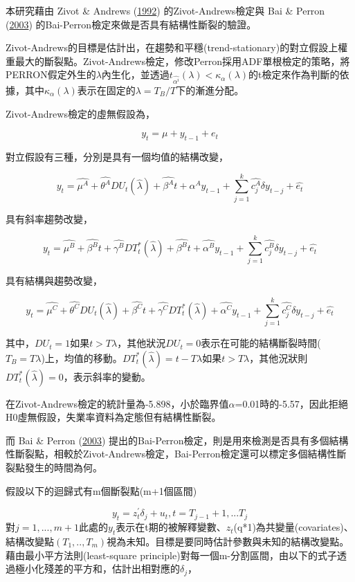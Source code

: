 \documentclass[oneside]{book}
\begin{document}
本研究藉由 Zivot \& Andrews (\protect\hyperlink{ref-zivotFurtherEvidenceGreat1992}{1992}) 的Zivot-Andrews檢定與 Bai \& Perron (\protect\hyperlink{ref-baiComputationAnalysisMultiple2003}{2003}) 的Bai-Perron檢定來做是否具有結構性斷裂的驗證。

Zivot-Andrews的目標是估計出，在趨勢和平穩(trend-stationary)的對立假設上權重最大的斷裂點。Zivot-Andrews檢定，修改Perron採用ADF單根檢定的策略，將PERRON假定外生的\(\lambda\)內生化，並透過\(t_{\hat{\alpha^i}}(\lambda)<\kappa_\alpha(\lambda)\)的t檢定來作為判斷的依據，其中\(\kappa_\alpha(\lambda)\)表示在固定的\(\lambda=T_B/T\)下的漸進分配。

Zivot-Andrews檢定的虛無假設為，

\[y_t = \mu+y_{t-1}+e_t\]

對立假設有三種，分別是具有一個均值的結構改變，

\[y_t=\hat{\mu^A}+\hat{\theta^A}DU_t(\hat{\lambda})+\hat{\beta^A}t+\hat{\alpha^A}y_{t-1}+\sum\limits^k_{j=1}\hat{c_j^A}\delta y_{t-j}+\hat{e_t}\]

具有斜率趨勢改變，

\[y_t=\hat{\mu^B}+\hat{\beta^B}t+\hat{\gamma^B}DT^*_t(\hat{\lambda})+\hat{\beta^B}t+\hat{\alpha^B}y_{t-1}+\sum\limits^k_{j=1}\hat{c_j^B}\delta y_{t-j}+\hat{e_t}\]

具有結構與趨勢改變，

\[y_t=\hat{\mu^C}+\hat{\theta^C}DU_t(\hat{\lambda})+\hat{\beta^C}t+\hat{\gamma^C}DT^*_t(\hat{\lambda})+\hat{\alpha^C}y_{t-1}+\sum\limits^k_{j=1}\hat{c_j^C}\delta y_{t-j}+\hat{e_t}\]

其中，\(DU_t=1\)如果\(t>T\lambda\)，其他狀況\(DU_t=0\)表示在可能的結構斷裂時間(\(T_B=T\lambda\))上，均值的移動。\(DT^*_t(\hat{\lambda})=t-T\lambda\)如果\(t>T\lambda\)，其他況狀則\(DT^*_t(\hat{\lambda})=0\)，表示斜率的變動。

在Zivot-Andrews檢定的統計量為-5.898，小於臨界值\(\alpha\)=0.01時的-5.57，因此拒絕H0虛無假設，失業率資料為定態但有結構性斷裂。

而 Bai \& Perron (\protect\hyperlink{ref-baiComputationAnalysisMultiple2003}{2003}) 提出的Bai-Perron檢定，則是用來檢測是否具有多個結構性斷裂點，相較於Zivot-Andrews檢定，Bai-Perron檢定還可以標定多個結構性斷裂點發生的時間為何。

假設以下的迴歸式有m個斷裂點(m+1個區間)

\[y_t=z_t^{'}\delta_j+u_t,t=T_{j-1}+1,...T_j\]
對\(j=1,...,m+1\)此處的\(y_t\)表示在t期的被解釋變數、\(z_t\)(q*1)為共變量(covariates)、結構改變點\((T_1,..,T_m)\)視為未知。目標是要同時估計參數與未知的結構改變點。藉由最小平方法則(least-square principle)對每一個m-分割區間，由以下的式子透過極小化殘差的平方和，估計出相對應的\(\delta_j\)，
\end{document}
